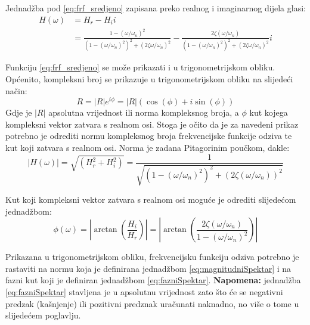 Jednadžba pod \eqref{eq:frf_sredjeno} zapisana preko realnog i imaginarnog dijela
glasi:
\begin{equation}\label{eq:frf_pravokutni}
    \begin{split}
        H(\omega) &= H_r - H_ii  \\
              &= \frac{1-(\omega/\omega_n)^2}{(1-(\omega/\omega_n)^2)^2+(2\zeta\omega/\omega_n)^2}
              -\frac{2\zeta(\omega/\omega_n)}{(1-(\omega/\omega_n)^2)^2+(2\zeta\omega/\omega_n)^2}i
    \end{split}
\end{equation}

Funkciju \eqref{eq:frf_sredjeno} se može prikazati i u trigonometrijskom obliku.
Općenito, kompleksni broj se prikazuje u trigonometrijskom obliku na slijedeći
način:
\begin{equation}\label{eq:trig_zapis_kompleksni_br}
    R=|R|e^{i\phi} = |R|(\cos(\phi)+i\sin(\phi))
\end{equation}
Gdje je $|R|$ apsolutna vrijednost ili norma kompleksnog broja, a $\phi$ kut kojega 
kompleksni vektor zatvara s realnom osi.
Stoga je očito da je za navedeni prikaz potrebno je odrediti normu kompleksnog
broja frekvencijske funkcije odziva te kut koji zatvara s realnom osi. Norma je 
zadana Pitagorinim poučkom, dakle:
\begin{equation}\label{eq:magnitudniSpektar}
    |H(\omega)|=\sqrt{(H_r^2+H_i^2)}
               =\frac{1}{\sqrt{(1-(\omega/\omega_n)^2)^2+(2\zeta(\omega/\omega_n))^2}}
\end{equation}

Kut koji kompleksni vektor zatvara s realnom osi moguće je odrediti slijedećom
jednadžbom:
\begin{equation}\label{eq:fazniSpektar}
    \phi(\omega)= \left|\arctan\left(\frac{H_i}{H_r}\right)\right| 
                = \left|\arctan\left(\frac{2\zeta(\omega/\omega_n)}
                        {1-(\omega/\omega_n)^2}\right)\right|
\end{equation}

Prikazana u trigonometrijskom obliku, frekvencijsku funkciju odziva potrebno je
rastaviti na normu koja je definirana jednadžbom \eqref{eq:magnitudniSpektar} i
na fazni kut koji je definiran jednadžbom \eqref{eq:fazniSpektar}.
\textbf{Napomena:} jednadžba \eqref{eq:fazniSpektar} stavljena je u apsolutnu
vrijednost zato što će se negativni predzak (kašnjenje) ili pozitivni predznak
uračunati naknadno, no više o tome u slijedećem poglavlju.
